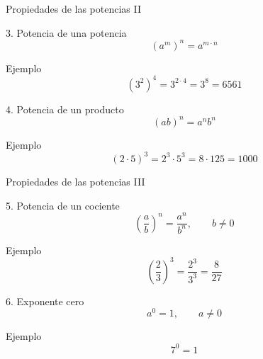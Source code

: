 \documentclass[aspectratio=169,10pt,handout]{beamer}
\begin{document}
	\begin{frame}{Propiedades de las potencias II}
		\begin{block}{3. Potencia de una potencia}
			\[
			(a^m)^n = a^{m\cdot n}
			\]
		\end{block}
		
		\begin{exampleblock}{Ejemplo}
			\[
			(3^2)^4 = 3^{2\cdot4}=3^8=6561
			\]
		\end{exampleblock}
		
		\pause
		
		\begin{block}{4. Potencia de un producto}
			\[
			(ab)^n = a^n b^n
			\]
		\end{block}
		
		\begin{exampleblock}{Ejemplo}
			\[
			(2\cdot5)^3 = 2^3\cdot5^3 = 8\cdot125 = 1000
			\]
		\end{exampleblock}
	\end{frame}
	
	\begin{frame}{Propiedades de las potencias III}
		\begin{block}{5. Potencia de un cociente}
			\[
			\left(\frac{a}{b}\right)^n = \frac{a^n}{b^n}, \qquad b\neq 0
			\]
		\end{block}
		
		\begin{exampleblock}{Ejemplo}
			\[
			\left(\frac{2}{3}\right)^3 = \frac{2^3}{3^3}=\frac{8}{27}
			\]
		\end{exampleblock}
		
		\pause
		
		\begin{block}{6. Exponente cero}
			\[
			a^0 = 1, \qquad a\neq 0
			\]
		\end{block}
		
		\begin{exampleblock}{Ejemplo}
			\[
			7^0 = 1
			\]
		\end{exampleblock}
	\end{frame}
	
\end{document}
